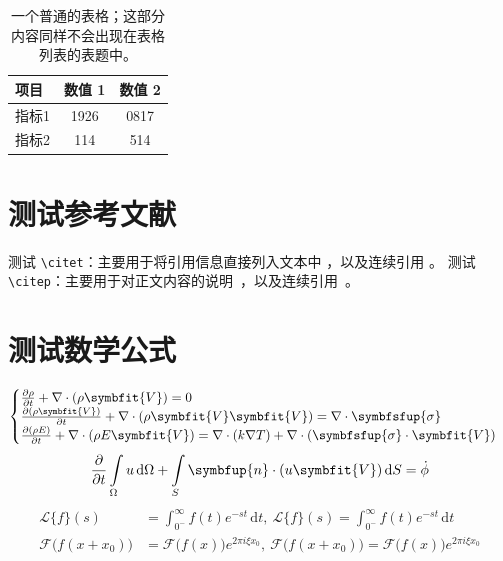 \documentclass[
  fontset = mac,
]{shtthesis}
\providecommand{\Vector}[1]{\symbfit{#1}}
\providecommand{\unitVector}[1]{\symbfup{#1}}
\providecommand{\Tensor}[1]{\symbfsfup{#1}}
\begin{document}
\begin{table}[htb]
  \centering
  \caption[一个普通的表格]{一个普通的表格；这部分内容同样不会出现在表格列表的表题中。}
  \begin{tabular}{lcc}
    \hline
    项目 & 数值 1 & 数值 2 \\
    \hline
    指标1 & 1926 & 0817 \\
    指标2 & 114  & 514 \\
    \hline
  \end{tabular}
\end{table}

\section{测试参考文献}
测试 \verb|\citet|：主要用于将引用信息直接列入文本中 \citet{wikibook2014latex}，以及连续引用 \citet{lamport1986document, chen2005zhulu}。
测试 \verb|\citep|：主要用于对正文内容的说明~\citep{chu2004tushu}，以及连续引用~\citep{stamerjohanns2009mathml, betts2005aging}。

\section{测试数学公式}

\begin{equation}
    \begin{cases}
        \frac{\partial \rho}{\partial t} + \nabla\cdot(\rho\Vector{V}) = 0\\
        \frac{\partial (\rho\Vector{V})}{\partial t} + \nabla\cdot(\rho\Vector{V}\Vector{V}) = \nabla\cdot\Tensor{\sigma}\\
        \frac{\partial (\rho E)}{\partial t} + \nabla\cdot(\rho E\Vector{V}) = \nabla\cdot(k\nabla T) + \nabla\cdot(\Tensor{\sigma}\cdot\Vector{V})
    \end{cases}
\end{equation}
\begin{equation}
    \frac{\partial }{\partial t}\int\limits_{\Omega} u \, \mathrm{d}\Omega + \int\limits_{S} \unitVector{n}\cdot(u\Vector{V}) \, \mathrm{d}S = \dot{\phi}
\end{equation}
\[
    \begin{split}
        \mathcal{L} \{f\}(s) &= \int _{0^{-}}^{\infty} f(t) e^{-st} \, \mathrm{d}t, \ 
        \mathscr{L} \{f\}(s) = \int _{0^{-}}^{\infty} f(t) e^{-st} \, \mathrm{d}t\\
        \mathcal{F} {\bigl (} f(x+x_{0}) {\bigr )} &= \mathcal{F} {\bigl (} f(x) {\bigr )} e^{2\pi i\xi x_{0}}, \ 
        \mathscr{F} {\bigl (} f(x+x_{0}) {\bigr )} = \mathscr{F} {\bigl (} f(x) {\bigr )} e^{2\pi i\xi x_{0}}
    \end{split}
\]
\end{document}
